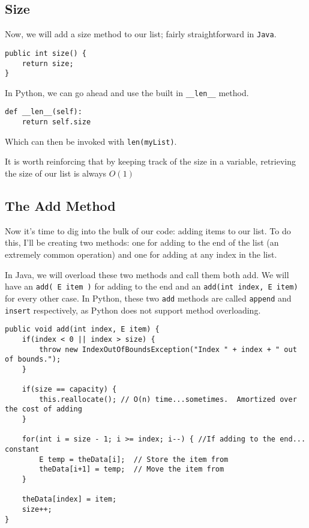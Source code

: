 \subsection{Size}
Now, we will add a size method to our list; fairly straightforward in \texttt{Java}.

\begin{verbatim}
public int size() {  
	return size;
}
\end{verbatim}

In Python, we can go ahead and use the built in \texttt{\_\_len\_\_} method.

\begin{verbatim}
def __len__(self):
	return self.size
\end{verbatim}

Which can then be invoked with \texttt{len(myList)}.


It is worth reinforcing that by keeping track of the size in a variable, retrieving the size of our list is always $O(1)$

\subsection{The Add Method}
Now it's time to dig into the bulk of our code: adding items to our list.
To do this, I'll be creating two methods:  one for adding to the end of the list (an extremely common operation) and one for adding at any index in the list.


In Java, we will overload these two methods and call them both add.  We will have an \texttt{add( E item )} for adding to the end and an \texttt{add(int index, E item)} for every other case.  
In Python, these two \texttt{add} methods are called \texttt{append} and \texttt{insert} respectively, as Python does not support method overloading.




\begin{verbatim}
public void add(int index, E item) {
	if(index < 0 || index > size) {
		throw new IndexOutOfBoundsException("Index " + index + " out of bounds.");
	}
	
	if(size == capacity) {  
		this.reallocate(); // O(n) time...sometimes.  Amortized over the cost of adding
	}
	
	for(int i = size - 1; i >= index; i--) { //If adding to the end... constant
		E temp = theData[i];  // Store the item from 
		theData[i+1] = temp;  // Move the item from 
	}
	
	theData[index] = item;
	size++;
}
\end{verbatim}


